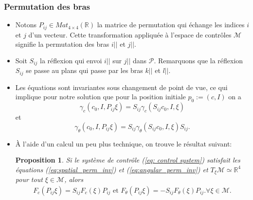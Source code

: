 \documentclass[10pt,a4paper]{article}
\theoremstyle{plain}
\theoremstyle{plain}
\theoremstyle{plain}
\theoremstyle{definition}
\theoremstyle{definition}
\theoremstyle{definition}
\theoremstyle{plain}
\newtheorem{proposition}{Proposition}[section]
\newcommand{\M}{\mathcal{M}}
\newcommand{\R}{\mathbb{R}}
\begin{document}
\subsubsection{Permutation des bras}
\begin{itemize}
\item Notons $P_{ij} \in Mat_{4 \times 4}(\R)$ la matrice de permutation qui échange les indices $i$ et $j$ d'un vecteur. Cette transformation appliquée à l'espace de contrôles $\M$ signifie la permutation des bras $i||$ et $j||$.

\item Soit $S_{ij}$ la réflexion qui envoi $i ||$ sur $j||$ dans $\mathcal{P}$. Remarquons que la réflexion $S_{ij}$ se passe au plans qui passe par les bras $k||$ et $l||$.

\item Les équations sont invariantes sous changement de point de vue, ce qui implique pour notre solution que pour la position initiale $p_0 := (c, I)$ on a
\begin{equation}
\label{eq:spatial_perm_inv}
	\gamma_c(c_0, I, P_{ij} \xi) = S_{ij} \gamma_c(S_{ij}c_0, I, \xi)
\end{equation}
et
\begin{equation}
\label{eq:angular_perm_inv}
	\gamma_{\theta}(c_0, I, P_{ij} \xi ) = S_{ij} \gamma_{\theta} (S_{ij} c_0, I, \xi) S_{ij}.
\end{equation}

\item À l'aide d'un calcul un peu plus technique, on trouve le résultat suivant:

\begin{proposition}
\label{prop: spatial permutation invariance}
Si le système de contrôle (\ref{eq: control system}) satisfait les équations (\ref{eq:spatial_perm_inv}) et (\ref{eq:angular_perm_inv}) et $T_{\xi} \M \simeq \R^4$ pour tout $\xi \in \M$, alors
\begin{align}
	 F_c(P_{ij} \xi) = S_{ij} F_c(\xi) P_{ij} \text{ et } F_{\theta}(P_{ij} \xi) = - S_{ij} F_{\theta}(\xi) P_{ij}. \forall \xi \in \M.
\end{align}
\end{proposition}


\end{itemize}
\end{document}

